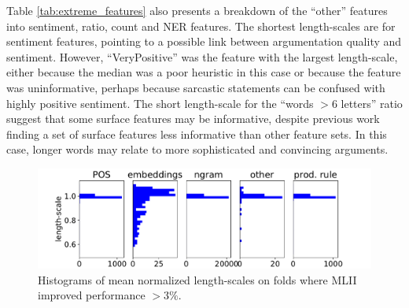 Table \ref{tab:extreme_features} also presents a breakdown of the ``other'' features into sentiment, ratio, count and NER features. 
The shortest length-scales are for sentiment features, pointing to a possible link between 
argumentation quality and sentiment. However, ``VeryPositive'' was the feature with
the largest length-scale, either because the median was a poor heuristic in this case or
because the feature was uninformative, perhaps because sarcastic statements can be confused with highly positive sentiment.
The short length-scale for the ``words $>6$ letters'' ratio suggest that some surface features may be informative,
despite previous work \cite{wei2016post} finding a set of surface features less informative than other feature sets. 
In this case, longer words may relate to more sophisticated and convincing arguments. 
\begin{figure}[h]
\includegraphics[width=\columnwidth, clip=True, trim=32 0 57 0]{figures/features2/boxplot}
\caption{Histograms of mean normalized length-scales on folds where MLII improved performance $>3\%$.}
\label{fig:boxplot}
\end{figure}
